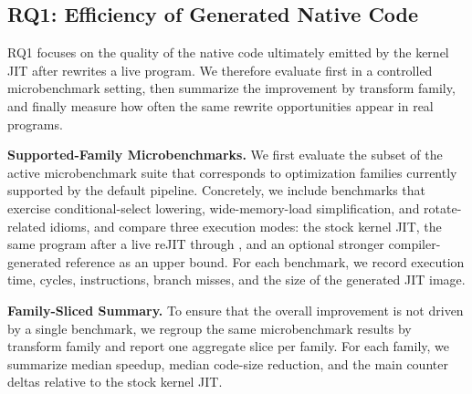 \subsection{RQ1: Efficiency of Generated Native Code}
\label{subsec:rq1}

RQ1 focuses on the quality of the native code ultimately emitted by the kernel JIT after \tool rewrites a live program. We therefore evaluate \tool first in a controlled microbenchmark setting, then summarize the improvement by transform family, and finally measure how often the same rewrite opportunities appear in real programs.

\noindent\textbf{Supported-Family Microbenchmarks.}
We first evaluate the subset of the active microbenchmark suite that corresponds to optimization families currently supported by the default \tool pipeline. Concretely, we include benchmarks that exercise conditional-select lowering, wide-memory-load simplification, and rotate-related idioms, and compare three execution modes: the stock kernel JIT, the same program after a live reJIT through \tool, and an optional stronger compiler-generated reference as an upper bound. For each benchmark, we record execution time, cycles, instructions, branch misses, and the size of the generated JIT image.


\noindent\textbf{Family-Sliced Summary.}
To ensure that the overall improvement is not driven by a single benchmark, we regroup the same microbenchmark results by transform family and report one aggregate slice per family. For each family, we summarize median speedup, median code-size reduction, and the main counter deltas relative to the stock kernel JIT.


